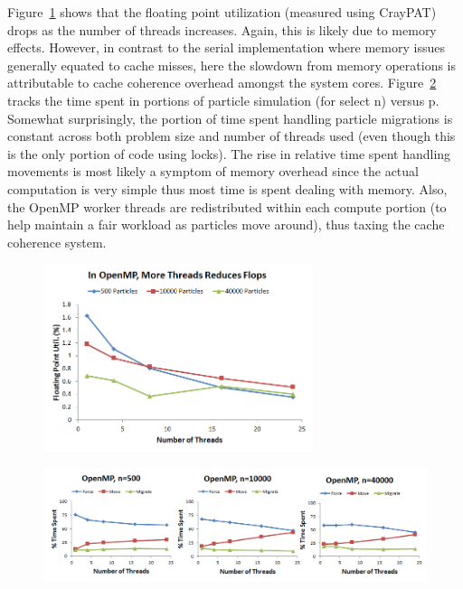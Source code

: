 \documentclass[11pt]{article} %
\begin{document}
Figure~\ref{openmp_mb_flops} shows that the floating point utilization (measured using CrayPAT) drops as the number of threads increases. Again, this is likely due to memory effects. However, in contrast to the serial implementation where memory issues generally equated to cache misses, here the slowdown from memory operations is attributable to cache coherence overhead amongst the system cores. Figure~\ref{openmp_mb_rtime} tracks the time spent in portions of particle simulation (for select n) versus p. Somewhat surprisingly, the portion of time spent handling particle migrations is constant across both problem size and number of threads used (even though this is the only portion of code using locks). The rise in relative time spent handling movements is most likely a symptom of memory overhead since the actual computation is very simple thus most time is spent dealing with memory. Also, the OpenMP worker threads are redistributed within each compute portion (to help maintain a fair workload as particles move around), thus taxing the cache coherence system.

\begin{figure}[!h]
\centering
\includegraphics[width=0.7\textwidth]{figures/openmp_mb_flops.png}
\caption{}
\label{openmp_mb_flops}
\end{figure}

\begin{figure}[!h]
\centering
\includegraphics[width=1\textwidth]{figures/openmp_mb_rtime.png}
\caption{}
\label{openmp_mb_rtime}
\end{figure}
\end{document}
